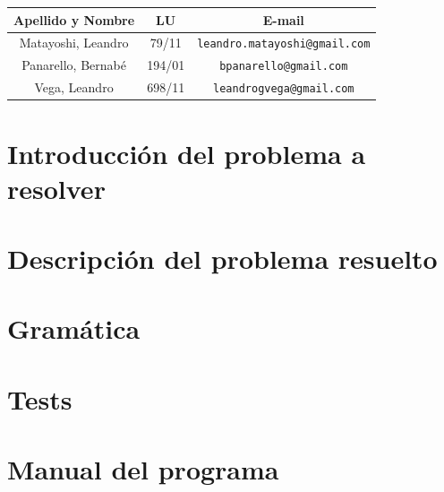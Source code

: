 \documentclass[a4paper, 10pt, twoside]{article}
\begin{document}
\begin{center}
\vspace{0.5cm}

\begin{tabular}{|c|c|c|}
\hline
Apellido y Nombre & LU & E-mail\\
\hline
Matayoshi, Leandro  & 79/11 & {\tt leandro.matayoshi@gmail.com}\\
Panarello, Bernabé  & 194/01 & {\tt bpanarello@gmail.com}\\
Vega, Leandro    & 698/11 & {\tt leandrogvega@gmail.com}\\
\hline
\end{tabular}

\end{center}

\newpage
{}



\tableofcontents

\newpage



\section{Introducción del problema a resolver}

\newpage

\section{Descripción del problema resuelto}

\newpage

\section{Gramática}

\newpage

\section{Tests}

\newpage

\section{Manual del programa}

\newpage
\end{document}

